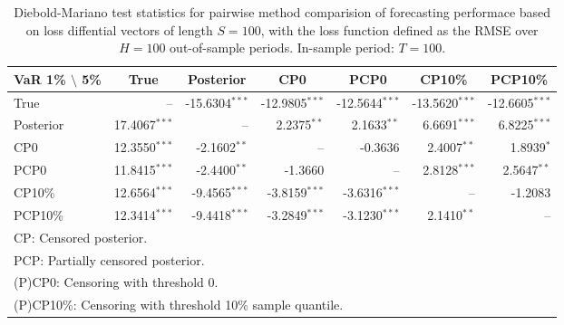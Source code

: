 { \renewcommand{\arraystretch}{1.2} 
\begin{table} 
\center 
\begin{tabular}{l | rrr rrr} 
VaR 1\% $\setminus$ 5\% & \multicolumn{1}{c}{True} & \multicolumn{1}{c}{Posterior} & \multicolumn{1}{c}{CP0} & \multicolumn{1}{c}{PCP0} & \multicolumn{1}{c}{CP10\%} & \multicolumn{1}{c}{PCP10\%} \\ \hline 
True &    --\phantom{$^{***}$} & -15.6304$^{***}$ & -12.9805$^{***}$ & -12.5644$^{***}$ & -13.5620$^{***}$ & -12.6605$^{***}$  \\ 
Posterior & 17.4067$^{***}$ &    --\phantom{$^{***}$} & 2.2375$^{**}$\phantom{$^{*}$} & 2.1633$^{**}$\phantom{$^{*}$} & 6.6691$^{***}$ & 6.8225$^{***}$  \\ 
CP0 & 12.3550$^{***}$ & -2.1602$^{**}$\phantom{$^{*}$} &    --\phantom{$^{***}$} & -0.3636\phantom{$^{***}$} & 2.4007$^{**}$\phantom{$^{*}$} & 1.8939$^{*}$\phantom{$^{**}$}  \\ 
PCP0 & 11.8415$^{***}$ & -2.4400$^{**}$\phantom{$^{*}$} & -1.3660\phantom{$^{***}$} &    --\phantom{$^{***}$} & 2.8128$^{***}$ & 2.5647$^{**}$\phantom{$^{*}$}  \\ 
CP10\% & 12.6564$^{***}$ & -9.4565$^{***}$ & -3.8159$^{***}$ & -3.6316$^{***}$ &    --\phantom{$^{***}$} & -1.2083\phantom{$^{***}$}  \\ 
PCP10\% & 12.3414$^{***}$ & -9.4418$^{***}$ & -3.2849$^{***}$ & -3.1230$^{***}$ & 2.1410$^{**}$\phantom{$^{*}$} &    --\phantom{$^{***}$}  \\ 
\hline 
\multicolumn{7}{l}{\footnotesize{CP: Censored posterior.}}  \\ 
\multicolumn{7}{l}{\footnotesize{PCP: Partially censored posterior.}} \\ 
\multicolumn{7}{l}{\footnotesize{(P)CP0: Censoring with threshold 0.}} \\ 
\multicolumn{7}{l}{\footnotesize{(P)CP10\%: Censoring with threshold 10\% sample quantile.}}  \\ 
\end{tabular}
 \caption{Diebold-Mariano test statistics for  pairwise method comparision of forecasting performace based on loss diffential vectors of length $S = 100$, with the loss function defined as the RMSE over $H=100$ out-of-sample periods. In-sample period: $T = 100$.} 
\label{tab:ar1_DM_T_100}  
\end{table}
}